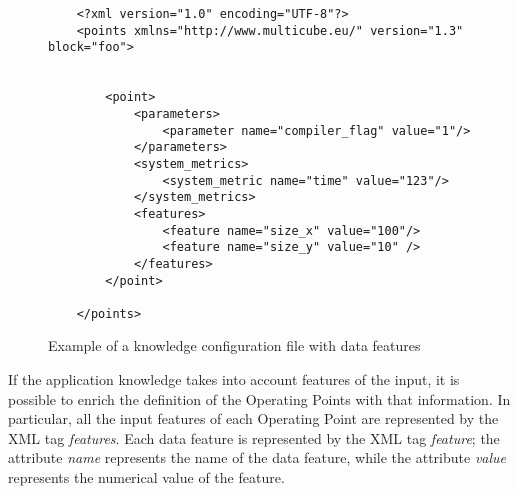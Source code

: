 \begin{figure}
	\lstset{language=XML}
	\begin{lstlisting}
	<?xml version="1.0" encoding="UTF-8"?>
	<points xmlns="http://www.multicube.eu/" version="1.3" block="foo">
	
	
		<point>
			<parameters>
				<parameter name="compiler_flag" value="1"/>
			</parameters>
			<system_metrics>
				<system_metric name="time" value="123"/>
			</system_metrics>
			<features>
				<feature name="size_x" value="100"/>
				<feature name="size_y" value="10" />
			</features>
		</point>
	
	</points>
	\end{lstlisting}
	\caption{Example of a knowledge configuration file with data features}
	\label{code:knowledge_file_data_feature}
\end{figure}

If the application knowledge takes into account features of the input, it is possible to enrich the definition of the Operating Points with that information.
In particular, all the input features of each Operating Point are represented by the XML tag \textit{features}.
Each data feature is represented by the XML tag \textit{feature}; the attribute \textit{name} represents the name of the data feature, while the attribute \textit{value} represents the numerical value of the feature.
